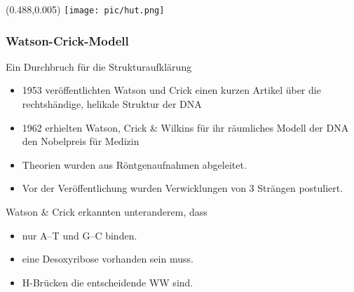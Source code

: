 	
	
	\begin{frame}
	\poslogo
	\begin{textblock}{1}(0.488,0.005)
   \texttt{[image: pic/hut.png]}
  \end{textblock} 
	\frametitle{Watson-Crick-Modell}
	\begin{block}{Ein Durchbruch für die Strukturaufklärung}
	\begin{itemize}
	\item 1953 veröffentlichten Watson und Crick einen kurzen Artikel über die rechtshändige, helikale Struktur der DNA
	\item 1962 erhielten Watson, Crick \& Wilkins für ihr räumliches Modell der DNA den Nobelpreis für Medizin
	\end{itemize}
	\end{block}	
	\vspace{0.2cm}
	\begin{itemize}
	\item Theorien wurden aus Röntgenaufnahmen abgeleitet.
	\item Vor der Veröffentlichung wurden Verwicklungen von 3 Strängen postuliert.
	\end{itemize}
	Watson \& Crick erkannten unteranderem, dass 
	\begin{itemize}
	\item nur A--T und G--C binden.
	\item eine Desoxyribose vorhanden sein muss.
	\item H-Brücken die entscheidende WW sind.
	\end{itemize}
	\end{frame}
